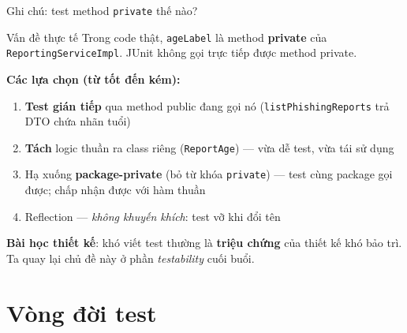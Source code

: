 \documentclass[aspectratio=169,12pt]{beamer}
\begin{document}
\begin{frame}{Ghi chú: test method \texttt{private} thế nào?}
  \begin{alertblock}{Vấn đề thực tế}
    \small Trong code thật, \texttt{ageLabel} là method \textbf{private} của
    \texttt{ReportingServiceImpl}. JUnit không gọi trực tiếp được method private.
  \end{alertblock}

  \vspace{0.2em}
  {\small\textbf{Các lựa chọn (từ tốt đến kém):}}
  \begin{enumerate}
    \item \textbf{Test gián tiếp} qua method public đang gọi nó
          (\texttt{listPhishingReports} trả DTO chứa nhãn tuổi)
    \item \textbf{Tách} logic thuần ra class riêng (\texttt{ReportAge}) ---
          vừa dễ test, vừa tái sử dụng
    \item Hạ xuống \textbf{package-private} (bỏ từ khóa \texttt{private}) ---
          test cùng package gọi được; chấp nhận được với hàm thuần
    \item Reflection --- \textit{không khuyến khích}: test vỡ khi đổi tên
  \end{enumerate}

  \vspace{0.2em}
  {\small \textbf{Bài học thiết kế}: khó viết test thường là \textbf{triệu chứng}
  của thiết kế khó bảo trì. Ta quay lại chủ đề này ở phần \textit{testability}
  cuối buổi.}
\end{frame}

\section{Vòng đời test}
\end{document}
